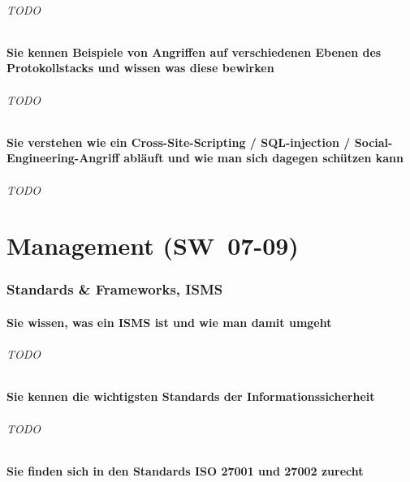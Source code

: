 \documentclass[10pt,a4paper]{article}
\begin{document}
\paragraph*{TODO}
\subsection*{Sie kennen Beispiele von Angriffen auf verschiedenen Ebenen des Protokollstacks und wissen was diese bewirken}
\paragraph*{TODO}
\subsection*{Sie verstehen wie ein Cross-Site-Scripting / SQL-injection / Social-Engineering-Angriff abläuft und wie man sich dagegen schützen kann}
\paragraph*{TODO}



\part{Management (SW~07-09)}
\section{Standards \& Frameworks, ISMS}
\subsection*{Sie wissen, was ein ISMS ist und wie man damit umgeht}
\paragraph*{TODO}
\subsection*{Sie kennen die wichtigsten Standards der Informationssicherheit}
\paragraph*{TODO}
\subsection*{Sie finden sich in den Standards ISO 27001 und 27002 zurecht}
\end{document}
